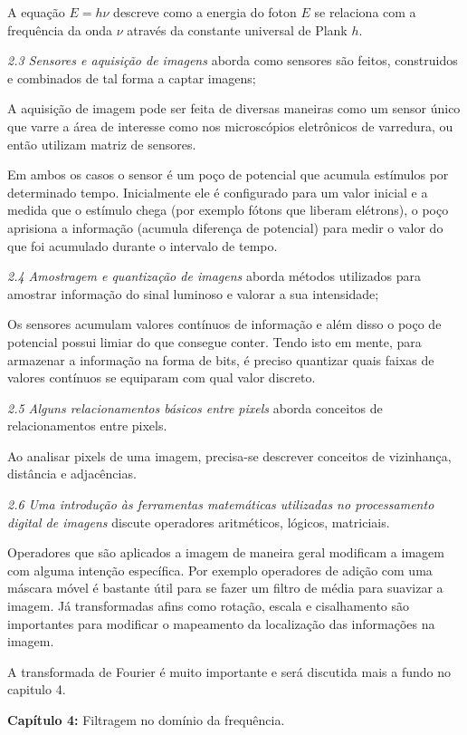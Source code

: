 \documentclass[a4paper]{sbgames}               %
\begin{document}
A equação $E=h\nu$ descreve como a energia do foton $E$ se relaciona com a frequência da onda $\nu$ através da constante universal de Plank $h$.

\textit{2.3 Sensores e aquisição de imagens} aborda como sensores são feitos, construidos e combinados de tal forma a captar imagens; 

A aquisição de imagem pode ser feita de diversas maneiras como um sensor único que varre a área de interesse como nos microscópios eletrônicos de varredura, ou então utilizam matriz de sensores.

Em ambos os casos o sensor é um poço de potencial que acumula estímulos por determinado tempo. Inicialmente ele é configurado para um valor inicial e a medida que o estímulo chega (por exemplo fótons que liberam elétrons), o poço aprisiona a informação (acumula diferença de potencial) para medir o valor do que foi acumulado durante o intervalo de tempo. 

\textit{2.4 Amostragem e quantização de imagens} aborda métodos utilizados para amostrar informação do sinal luminoso e valorar a sua intensidade; 

Os sensores acumulam valores contínuos de informação e além disso o poço de potencial possui limiar do que consegue conter. Tendo isto em mente, para armazenar a informação na forma de bits, é preciso quantizar quais faixas de valores contínuos se equiparam com qual valor discreto.  

\textit{2.5 Alguns relacionamentos básicos entre pixels} aborda conceitos de relacionamentos entre pixels.

Ao analisar pixels de uma imagem, precisa-se descrever conceitos de vizinhança, distância e adjacências. 

\textit{2.6 Uma introdução às ferramentas matemáticas utilizadas no processamento digital de imagens} discute operadores aritméticos, lógicos, matriciais.

Operadores que são aplicados a imagem de maneira geral modificam a imagem com alguma intenção específica. Por exemplo operadores de adição com uma máscara móvel é bastante útil para se fazer um filtro de média para suavizar a imagem. Já transformadas afins como rotação, escala e cisalhamento são importantes para modificar o mapeamento da localização das informações na imagem.

A transformada de Fourier é muito importante e será discutida mais a fundo no capitulo 4.

\pagebreak
\twocolumn
\textbf{Capítulo 4: } Filtragem no domínio da frequência.
\end{document}

